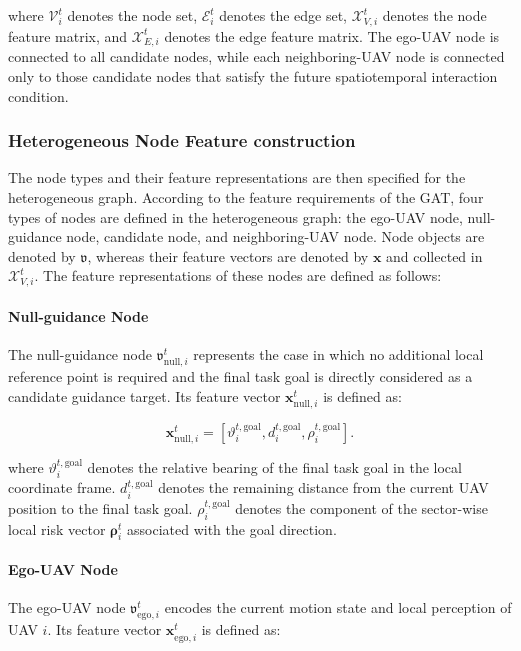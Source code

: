 \noindent
where $\mathcal{V}_{i}^{t}$ denotes the node set, $\mathcal{E}_{i}^{t}$ denotes the edge set, $\mathcal{X}_{V,i}^{t}$ denotes the node feature matrix, and $\mathcal{X}_{E,i}^{t}$ denotes the edge feature matrix. The ego-UAV node is connected to all candidate nodes, while each neighboring-UAV node is connected only to those candidate nodes that satisfy the future spatiotemporal interaction condition.

\subsubsection{Heterogeneous Node Feature construction}

The node types and their feature representations are then specified for the heterogeneous graph. According to the feature requirements of the GAT, four types of nodes are defined in the heterogeneous graph: the ego-UAV node, null-guidance node, candidate node, and neighboring-UAV node. Node objects are denoted by $\mathfrak v$, whereas their feature vectors are denoted by $\mathbf x$ and collected in $\mathcal X_{V,i}^{t}$. The feature representations of these nodes are defined as follows:

\paragraph{Null-guidance Node}
The null-guidance node $\mathfrak{v}_{\mathrm{null},i}^{t}$ represents the case in which no additional local reference point is required and the final task goal is directly considered as a candidate guidance target. Its feature vector $\mathbf{x}_{\mathrm{null},i}^{t}$ is defined as:

\begin{equation}
    \label{eq:null_node}
    \mathbf{x}_{\mathrm{null},i}^{t}
    =
    \left[
        \vartheta_{i}^{t,\mathrm{goal}},
        d_{i}^{t,\mathrm{goal}},
        \rho_{i}^{t,\mathrm{goal}}
    \right].
\end{equation}

\noindent
where $\vartheta_{i}^{t,\mathrm{goal}}$ denotes the relative bearing of the final task goal in the local coordinate frame. $d_{i}^{t,\mathrm{goal}}$ denotes the remaining distance from the current UAV position to the final task goal. $\rho_{i}^{t,\mathrm{goal}}$ denotes the component of the sector-wise local risk vector $\boldsymbol{\rho}_{i}^{t}$ associated with the goal direction.

\paragraph{Ego-UAV Node}
The ego-UAV node $\mathfrak{v}_{\mathrm{ego},i}^{t}$ encodes the current motion state and local perception of UAV $i$. Its feature vector $\mathbf{x}_{\mathrm{ego},i}^{t}$ is defined as:

